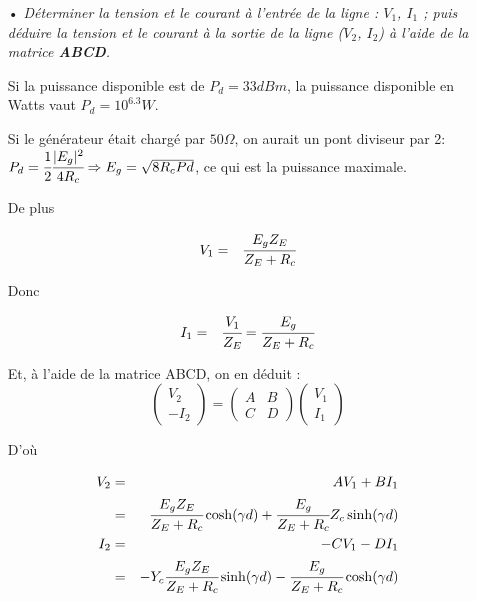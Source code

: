\documentclass[10pt]{article}
\begin{document}
\begin{itemize}
    \item[•] \textit{Déterminer la tension et le courant à l'entrée de la ligne : $V_1$, $I_1$ ; puis déduire la tension et le courant à la sortie de la ligne ($V_2$, $I_2$) à l'aide de la matrice \textbf{ABCD}.}

        Si la puissance disponible est de $P_d = 33 dBm$, la puissance disponible en Watts vaut $P_d = 10^{6.3}W$.

        Si le générateur était chargé par $50 \Omega$, on aurait un pont diviseur par 2: $P_d = \cfrac{1}{2} \cfrac{|E_g|^2}{4R_c} \Rightarrow E_g = \sqrt{8 R_c Pd}$, ce qui est la puissance maximale.

        De plus

        \begin{eqnarray}
            V_1 &=& \cfrac{E_g Z_E}{Z_E+R_c}
        \end{eqnarray}

        Donc

        \begin{eqnarray}
            I_1 &=& \cfrac{V_1}{Z_E} = \cfrac{E_g}{Z_E+R_c}
        \end{eqnarray}

        Et, à l'aide de la matrice ABCD, on en déduit :
        \[
            \begin{pmatrix}
                V_2 \\
                -I_2
            \end{pmatrix}
            =
            \begin{pmatrix}
                A & B \\
                C & D
            \end{pmatrix}
            \begin{pmatrix}
                V_1 \\
                I_1
            \end{pmatrix}
        \]

        D'où

        \begin{eqnarray}
            V_2 &=& A V_1 + B I_1 \nonumber \\
            &=& \cfrac{E_g Z_E}{Z_E+R_c} \cosh(\gamma d) + \cfrac{E_g}{Z_E+R_c} Z_c \sinh(\gamma d)\\
            I_2 &=& -C V_1 - D I_1 \nonumber \\
            &=& - Y_c \cfrac{E_g Z_E}{Z_E+R_c} \sinh(\gamma d) - \cfrac{E_g}{Z_E+R_c} \cosh(\gamma d)
        \end{eqnarray}


\end{itemize}
\end{document}
